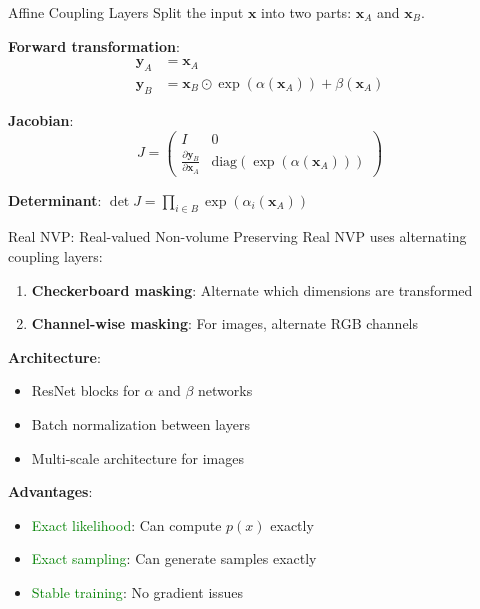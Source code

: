 \documentclass[aspectratio=169]{beamer}
\begin{document}
\begin{frame}{Affine Coupling Layers}
Split the input $\mathbf{x}$ into two parts: $\mathbf{x}_A$ and $\mathbf{x}_B$.

\textbf{Forward transformation}:
\begin{align}
    \mathbf{y}_A &= \mathbf{x}_A \\
    \mathbf{y}_B &= \mathbf{x}_B \odot \exp(\alpha(\mathbf{x}_A)) + \beta(\mathbf{x}_A)
\end{align}

\textbf{Jacobian}:
\begin{equation}
    J = \begin{pmatrix}
        I & 0 \\
        \frac{\partial \mathbf{y}_B}{\partial \mathbf{x}_A} & \text{diag}(\exp(\alpha(\mathbf{x}_A)))
    \end{pmatrix}
\end{equation}

\textbf{Determinant}: $\det J = \prod_{i \in B} \exp(\alpha_i(\mathbf{x}_A))$
\end{frame}

\begin{frame}{Real NVP: Real-valued Non-volume Preserving}
Real NVP uses alternating coupling layers:
\begin{enumerate}
    \item \textbf{Checkerboard masking}: Alternate which dimensions are transformed
    \item \textbf{Channel-wise masking}: For images, alternate RGB channels
\end{enumerate}

\textbf{Architecture}:
\begin{itemize}
    \item ResNet blocks for $\alpha$ and $\beta$ networks
    \item Batch normalization between layers
    \item Multi-scale architecture for images
\end{itemize}

\textbf{Advantages}:
\begin{itemize}
    \item \textcolor{green}{Exact likelihood}: Can compute $p(x)$ exactly
    \item \textcolor{green}{Exact sampling}: Can generate samples exactly
    \item \textcolor{green}{Stable training}: No gradient issues
\end{itemize}
\end{frame}
\end{document}
